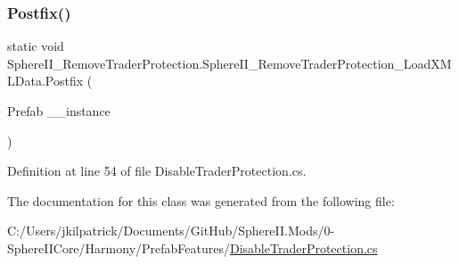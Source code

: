 \subsubsection{\texorpdfstring{Postfix()}{Postfix()}}
{\footnotesize\ttfamily static void Sphere\+I\+I\+\_\+\+Remove\+Trader\+Protection.\+Sphere\+I\+I\+\_\+\+Remove\+Trader\+Protection\+\_\+\+Load\+X\+M\+L\+Data.\+Postfix (\begin{DoxyParamCaption}\item[{Prefab}]{\+\_\+\+\_\+instance }\end{DoxyParamCaption})\hspace{0.3cm}{\ttfamily [static]}}



Definition at line 54 of file Disable\+Trader\+Protection.\+cs.



The documentation for this class was generated from the following file\+:\begin{DoxyCompactItemize}
\item 
C\+:/\+Users/jkilpatrick/\+Documents/\+Git\+Hub/\+Sphere\+I\+I.\+Mods/0-\/\+Sphere\+I\+I\+Core/\+Harmony/\+Prefab\+Features/\mbox{\hyperlink{_disable_trader_protection_8cs}{Disable\+Trader\+Protection.\+cs}}\end{DoxyCompactItemize}
